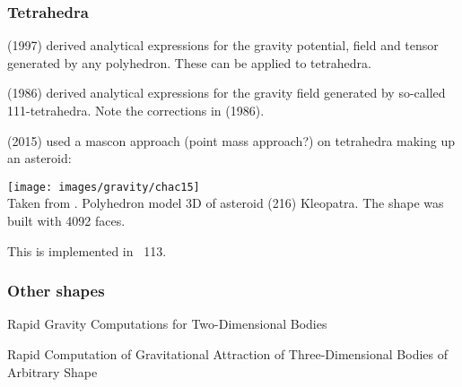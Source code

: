 \subsubsection{Tetrahedra}

\textcite{wesc97} (1997) derived analytical expressions for the gravity potential, field and tensor generated 
by any polyhedron. These can be applied to tetrahedra. 

\textcite{mequ86} (1986) derived analytical expressions for the gravity field generated 
by so-called 111-tetrahedra. Note the corrections in \textcite{camq86} (1986).

\textcite{chac15} (2015) used a mascon approach (point mass approach?) 
on tetrahedra making up an asteroid:

\begin{center}
\texttt{[image: images/gravity/chac15]}\\
{\captionfont Taken from \textcite{chac15}. Polyhedron model 3D of asteroid (216) Kleopatra. The shape
was built with 4092 faces.}
\end{center}

This is implemented in \stone~113.


\subsubsection{Other shapes}

\Literature

Rapid Gravity Computations for Two-Dimensional Bodies \cite{tawl59}

Rapid Computation of Gravitational Attraction of Three-Dimensional Bodies of Arbitrary Shape
\cite{taew60}




